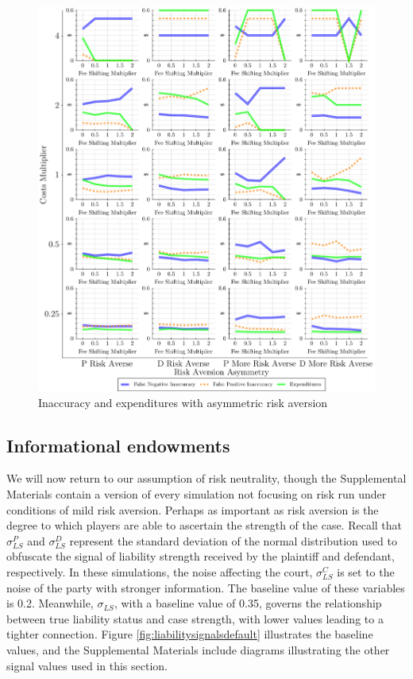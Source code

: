 \documentclass{article}
\begin{document}
\begin{figure}[h!]
\centering
\includegraphics[scale=0.50, trim={0in 0in 0in 0in}, clip]{../Figures/Accuracy and Expenditures Varying Risk Aversion Asymmetry.pdf}
\caption{Inaccuracy and expenditures with asymmetric risk aversion}
\label{fig:accexp_riskaversionasymmetry}
\end{figure}

\subsection{Informational endowments}

We will now return to our assumption of risk neutrality, though the Supplemental Materials contain a version of every simulation not focusing on risk run under conditions of mild risk aversion. Perhaps as important as risk aversion is the degree to which players are able to ascertain the strength of the case. Recall that $\sigma_{LS}^P$ and $\sigma_{LS}^D$ represent the standard deviation of the normal distribution used to obfuscate the signal of liability strength received by the plaintiff and defendant, respectively. In these simulations, the noise affecting the court, $\sigma_{LS}^C$ is set to the noise of the party with stronger information. The baseline value of these variables is 0.2. Meanwhile, $\sigma_{LS}$, with a baseline value of 0.35, governs the relationship between true liability status and case strength, with lower values leading to a tighter connection. Figure \ref{fig:liabilitysignalsdefault} illustrates the baseline values, and the Supplemental Materials include diagrams illustrating the other signal values used in this section.
\end{document}
